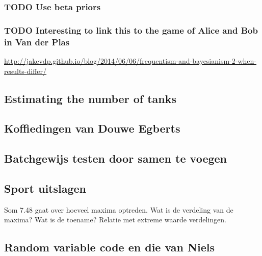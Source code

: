\documentclass[a4paper]{article}
\begin{document}
\subsubsection{{\bfseries\sffamily TODO} Use beta priors}
\label{sec:org9297a86}
\subsubsection{{\bfseries\sffamily TODO} Interesting to link this to the game of Alice and Bob in Van der Plas}
\label{sec:orgafbfbd0}
\url{http://jakevdp.github.io/blog/2014/06/06/frequentism-and-bayesianism-2-when-results-differ/}

\subsection{Estimating the number of tanks}
\label{sec:org0700c8f}


\subsection{Koffiedingen van Douwe Egberts}
\label{sec:orgbe91c90}

\subsection{Batchgewijs testen door samen te voegen}
\label{sec:org7f21ad2}



\subsection{Sport uitslagen}
\label{sec:org9a46c5b}

Som 7.48 gaat over hoeveel maxima optreden. Wat is de verdeling van de maxima? Wat is de toename? Relatie met extreme waarde verdelingen. 

\subsection{Random variable code en die van Niels}
\label{sec:org57ced54}
\end{document}
